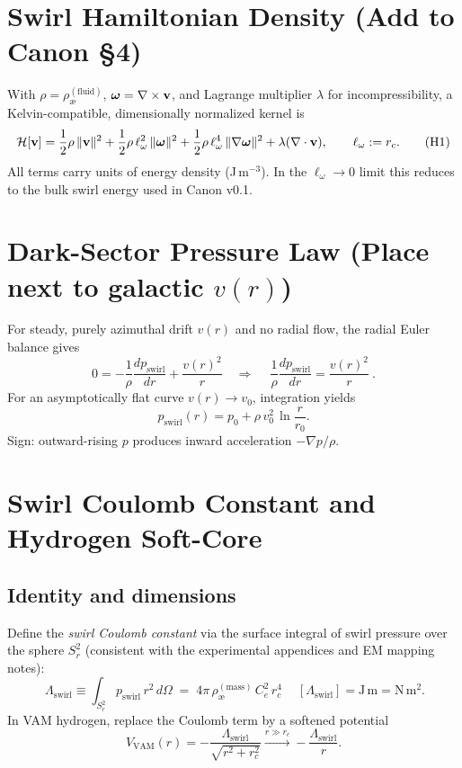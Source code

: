 \documentclass[11pt]{article}
\newcommand{\aeFluid}{\rho_{\text{\ae}}^{(\text{fluid})}}
\newcommand{\aeMass}{\rho_{\text{\ae}}^{(\text{mass})}}
\newcommand{\Ce}{C_e}
\newcommand{\rc}{r_c}
\newcommand{\Ham}{\mathcal{H}}
\newcommand{\Lam}{\Lambda_{\text{swirl}}}
\begin{document}
\section{Swirl Hamiltonian Density (Add to Canon \S4)}
\label{sec:hamiltonian}
With \(\rho=\aeFluid\), \(\bm{\omega}=\nabla\times \vb v\), and Lagrange multiplier \(\lambda\) for incompressibility, a Kelvin-compatible, dimensionally normalized kernel is
\begin{equation}
  \Ham[\vb v] = \frac{1}{2}\rho\,\|\vb v\|^2 + \frac{1}{2}\rho\,\ell_\omega^2\,\|\bm{\omega}\|^2 + \frac{1}{2}\rho\,\ell_\omega^4\,\|\nabla \bm{\omega}\|^2 + \lambda (\nabla\cdot \vb v),\qquad \ell_\omega:=\rc. \tag{H1}\label{eq:Hamiltonian}
\end{equation}
All terms carry units of energy density (J\,m\(^{-3}\)). In the \(\ell_\omega\to 0\) limit this reduces to the bulk swirl energy used in Canon v0.1.

\section{Dark-Sector Pressure Law (Place next to galactic \(v(r)\))}
\label{sec:darkpressure}
For steady, purely azimuthal drift \(v(r)\) and no radial flow, the radial Euler balance gives
\begin{equation}
  0=-\frac{1}{\rho}\frac{dp_{\text{swirl}}}{dr}+\frac{v(r)^2}{r}
  \quad\Longrightarrow\quad
  \boxed{\ \frac{1}{\rho}\frac{dp_{\text{swirl}}}{dr}=\frac{v(r)^2}{r}\ } . \tag{D1}\label{eq:darklaw}
\end{equation}
For an asymptotically flat curve \(v(r)\to v_0\), integration yields
\begin{equation}
  p_{\text{swirl}}(r)=p_0+\rho\,v_0^2\,\ln\!\frac{r}{r_0}. \tag{D2}
\end{equation}
Sign: outward-rising \(p\) produces inward acceleration \(-\nabla p/\rho\).

\section{Swirl Coulomb Constant and Hydrogen Soft-Core}
\label{sec:lambda-hydrogen}
\subsection{Identity and dimensions}
Define the \emph{swirl Coulomb constant} via the surface integral of swirl pressure over the sphere \(S_r^2\) (consistent with the experimental appendices and EM mapping notes):
\begin{equation}
  \boxed{\ \Lam \equiv \int_{S_r^2} p_{\text{swirl}}\, r^2\, d\Omega \;=\; 4\pi\,\aeMass\,\Ce^2\,\rc^4\ } \quad [\Lam]=\mathrm{J\,m} = \mathrm{N\,m^2}. \tag{E1}\label{eq:LambdaDef}
\end{equation}
In VAM hydrogen, replace the Coulomb term by a softened potential
\begin{equation}
  V_{\text{VAM}}(r) = -\frac{\Lam}{\sqrt{r^2+\rc^2}} \xrightarrow{r\gg \rc} -\frac{\Lam}{r}. \tag{E2}\label{eq:softcore}
\end{equation}
\end{document}

